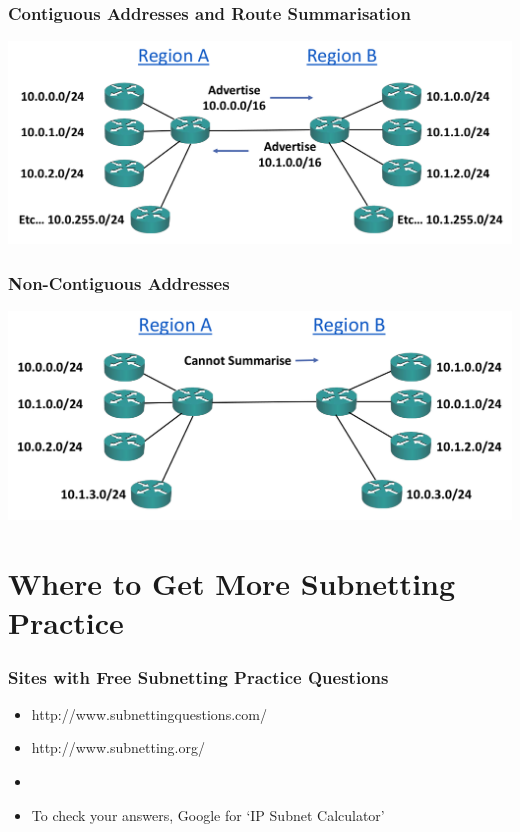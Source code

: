 \documentclass[pdflatex,compress]{beamer}
\begin{document}
\begin{frame}
	\frametitle{Contiguous Addresses and Route Summarisation}
	\begin{center}
		\includegraphics[width=\linewidth]{img/img30}
	\end{center}
\end{frame}

\begin{frame}
	\frametitle{Non-Contiguous Addresses}
	\begin{center}
		\includegraphics[width=\linewidth]{img/img31}
	\end{center}
\end{frame}

\section{Where to Get More Subnetting Practice}

\begin{frame}
	\frametitle{Sites with Free Subnetting Practice Questions}
	\begin{itemize}
		\item http://www.subnettingquestions.com/ \href{http://www.subnettingquestions.com/}{}
		\item http://www.subnetting.org/ \href{http://www.subnetting.org/}{}
		\item[]
		\item To check your answers, Google for ‘IP Subnet Calculator’
	\end{itemize}
\end{frame}
\end{document}
